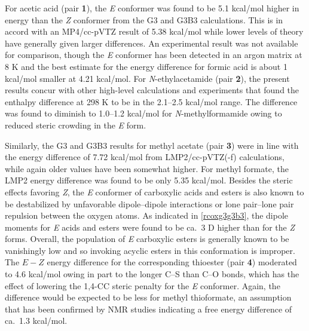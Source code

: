 \documentclass[12pt]{report}
\begin{document}
For acetic acid (pair \textbf{1}), the \textit{E} conformer was found to be 5.1 kcal/mol higher in energy than the \textit{Z} conformer from the G3 and G3B3 calculations. This is in accord with an MP4/cc-pVTZ result of 5.38 kcal/mol\cite{sen} while lower levels of theory have generally given larger differences.\cite{wibergez} An experimental result was not available for comparison, though the \textit{E} conformer has been detected in an argon matrix at 8 K\cite{mac} and the best estimate for the energy difference for formic acid is about 1 kcal/mol smaller at 4.21 kcal/mol.\cite{cs} For \textit{N}-ethylacetamide (pair \textbf{2}), the present results concur with other high-level calculations and experiments that found the enthalpy difference at 298 K to be in the 2.1--2.5 kcal/mol range.\cite{jez,murphy,vill,kang,mantz} The difference was found to diminish to 1.0--1.2 kcal/mol for \textit{N}-methylformamide owing to reduced steric crowding in the \textit{E} form.\cite{murphy,pawar}

Similarly, the G3 and G3B3 results for methyl acetate (pair \textbf{3}) were in line with the energy difference of 7.72 kcal/mol from LMP2/cc-pVTZ(-f) calculations,\cite{murphy} while again older values have been somewhat higher.\cite{wibergez,wibergez2,ev} For methyl formate, the LMP2 energy difference was found to be only 5.35 kcal/mol.\cite{zhong} Besides the steric effects favoring \textit{Z}, the \textit{E} conformer of carboxylic acids and esters is also known to be destabilized by unfavorable dipole--dipole interactions or lone pair--lone pair repulsion between the oxygen atoms.\cite{deer,sun} As indicated in \cref{rcoxg3g3b3}, the dipole moments for \textit{E} acids and esters were found to be ca.\ 3 D higher than for the \textit{Z} forms. Overall, the population of \textit{E} carboxylic esters is generally known to be vanishingly low and so invoking acyclic esters in this conformation is improper.\cite{huis,dunitz} The $E - Z$ energy difference for the corresponding thioester (pair \textbf{4}) moderated to 4.6 kcal/mol owing in part to the longer C--S than C--O bonds, which has the effect of lowering the 1,4-CC steric penalty for the \textit{E} conformer. Again, the difference would be expected to be less for methyl thioformate, an assumption that has been confirmed by NMR studies indicating a free energy difference of ca.\ 1.3 kcal/mol.\cite{pawar}

\end{document}
